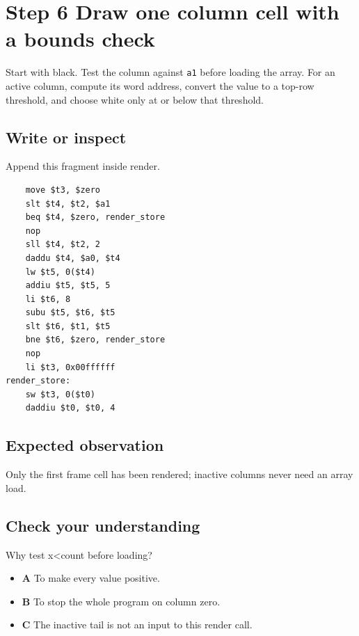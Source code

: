 \section{Step 6 Draw one column cell with a bounds
  check}\label{009-sorting-visualizer-s06-step-6-draw-one-column-cell-with-a-bounds-check}

Start with black. Test the column against \texttt{a1} before loading the
array. For an active column, compute its word address, convert the value
to a top-row threshold, and choose white only at or below that
threshold.

\subsection{Write or
  inspect}\label{009-sorting-visualizer-s06-write-or-inspect}

Append this fragment inside render.

\begin{verbatim}
    move $t3, $zero
    slt $t4, $t2, $a1
    beq $t4, $zero, render_store
    nop
    sll $t4, $t2, 2
    daddu $t4, $a0, $t4
    lw $t5, 0($t4)
    addiu $t5, $t5, 5
    li $t6, 8
    subu $t5, $t6, $t5
    slt $t6, $t1, $t5
    bne $t6, $zero, render_store
    nop
    li $t3, 0x00ffffff
render_store:
    sw $t3, 0($t0)
    daddiu $t0, $t0, 4
\end{verbatim}

\subsection{Expected
  observation}\label{009-sorting-visualizer-s06-expected-observation}

Only the first frame cell has been rendered; inactive columns never need
an array load.

\subsection{Check your
  understanding}\label{009-sorting-visualizer-s06-check-your-understanding}

Why test x\textless count before loading?

\begin{itemize}
  \tightlist
  \item
        \textbf{A} To make every value positive.
  \item
        \textbf{B} To stop the whole program on column zero.
  \item
        \textbf{C} The inactive tail is not an input to this render call.
\end{itemize}
